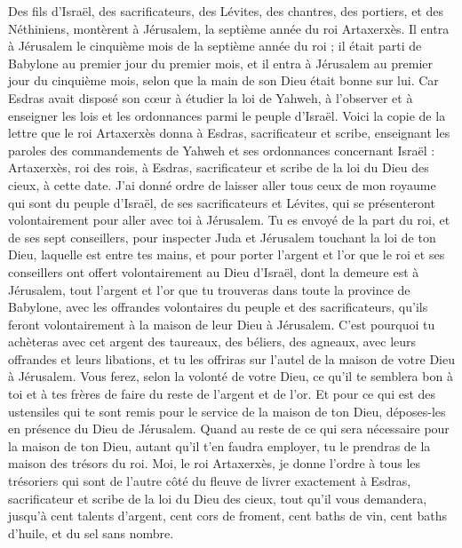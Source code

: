 \begin{multicols}{2}
Des fils d'Israël, des sacrificateurs, des Lévites, des chantres, des portiers, et des Néthiniens, montèrent à Jérusalem, la septième année du roi Artaxerxès.
Il entra à Jérusalem le cinquième mois de la septième année du roi ;
il était parti de Babylone au premier jour du premier mois, et il entra à Jérusalem au premier jour du cinquième mois, selon que la main de son Dieu était bonne sur lui.
Car Esdras avait disposé son cœur à étudier la loi de Yahweh, à l’observer et à enseigner les lois et les ordonnances parmi le peuple d'Israël.
Voici la copie de la lettre que le roi Artaxerxès donna à Esdras, sacrificateur et scribe, enseignant les paroles des commandements de Yahweh et ses ordonnances concernant Israël :
Artaxerxès, roi des rois, à Esdras, sacrificateur et scribe de la loi du Dieu des cieux, à cette date.
J’ai donné ordre de laisser aller tous ceux de mon royaume qui sont du peuple d'Israël, de ses sacrificateurs et Lévites, qui se présenteront volontairement pour aller avec toi à Jérusalem.
Tu es envoyé de la part du roi, et de ses sept conseillers, pour inspecter Juda et Jérusalem touchant la loi de ton Dieu, laquelle est entre tes mains,
et pour porter l'argent et l'or que le roi et ses conseillers ont offert volontairement au Dieu d'Israël, dont la demeure est à Jérusalem,
tout l'argent et l'or que tu trouveras dans toute la province de Babylone, avec les offrandes volontaires du peuple et des sacrificateurs, qu'ils feront volontairement à la maison de leur Dieu à Jérusalem.
 C'est pourquoi tu achèteras avec cet argent des taureaux, des béliers, des agneaux, avec leurs offrandes et leurs libations, et tu les offriras sur l'autel de la maison de votre Dieu à Jérusalem.
Vous ferez, selon la volonté de votre Dieu, ce qu'il te semblera bon à toi et à tes frères de faire du reste de l'argent et de l'or.
Et pour ce qui est des ustensiles qui te sont remis pour le service de la maison de ton Dieu, déposes-les en présence du Dieu de Jérusalem.
Quand au reste de ce qui sera nécessaire pour la maison de ton Dieu, autant qu'il t'en faudra employer, tu le prendras de la maison des trésors du roi.
Moi, le roi Artaxerxès, je donne l’ordre à tous les trésoriers qui sont de l'autre côté du fleuve de livrer exactement à Esdras, sacrificateur et scribe de la loi du Dieu des cieux, tout qu’il vous demandera,
jusqu'à cent talents d'argent, cent cors de froment, cent baths de vin, cent baths d'huile, et du sel sans nombre.

\end{multicols}
